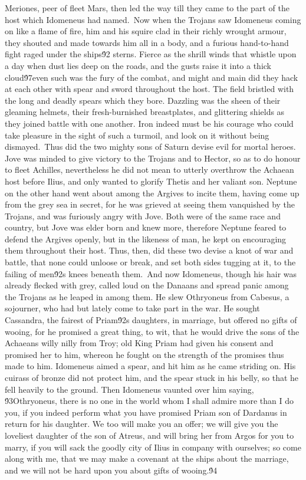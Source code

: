 {Meriones, peer of fleet Mars, then led the way till they came to the part of the host which Idomeneus had named.\
Now when the Trojans saw Idomeneus coming on like a flame of fire, him and his squire clad in their richly wrought armour, they shouted and made towards him all in a body, and a furious hand-to-hand fight raged under the ships\'92 sterns. Fierce as the shrill winds that whistle upon a day when dust lies deep on the roads, and the gusts raise it into a thick cloud\'97even such was the fury of the combat, and might and main did they hack at each other with spear and sword throughout the host. The field bristled with the long and deadly spears which they bore. Dazzling was the sheen of their gleaming helmets, their fresh-burnished breastplates, and glittering shields as they joined battle with one another. Iron indeed must be his courage who could take pleasure in the sight of such a turmoil, and look on it without being dismayed.\
Thus did the two mighty sons of Saturn devise evil for mortal heroes. Jove was minded to give victory to the Trojans and to Hector, so as to do honour to fleet Achilles, nevertheless he did not mean to utterly overthrow the Achaean host before Ilius, and only wanted to glorify Thetis and her valiant son. Neptune on the other hand went about among the Argives to incite them, having come up from the grey sea in secret, for he was grieved at seeing them vanquished by the Trojans, and was furiously angry with Jove. Both were of the same race and country, but Jove was elder born and knew more, therefore Neptune feared to defend the Argives openly, but in the likeness of man, he kept on encouraging them throughout their host. Thus, then, did these two devise a knot of war and battle, that none could unloose or break, and set both sides tugging at it, to the failing of men\'92s knees beneath them.\
And now Idomeneus, though his hair was already flecked with grey, called loud on the Danaans and spread panic among the Trojans as he leaped in among them. He slew Othryoneus from Cabesus, a sojourner, who had but lately come to take part in the war. He sought Cassandra, the fairest of Priam\'92s daughters, in marriage, but offered no gifts of wooing, for he promised a great thing, to wit, that he would drive the sons of the Achaeans willy nilly from Troy; old King Priam had given his consent and promised her to him, whereon he fought on the strength of the promises thus made to him. Idomeneus aimed a spear, and hit him as he came striding on. His cuirass of bronze did not protect him, and the spear stuck in his belly, so that he fell heavily to the ground. Then Idomeneus vaunted over him saying, \'93Othryoneus, there is no one in the world whom I shall admire more than I do you, if you indeed perform what you have promised Priam son of Dardanus in return for his daughter. We too will make you an offer; we will give you the loveliest daughter of the son of Atreus, and will bring her from Argos for you to marry, if you will sack the goodly city of Ilius in company with ourselves; so come along with me, that we may make a covenant at the ships about the marriage, and we will not be hard upon you about gifts of wooing.\'94\
}

